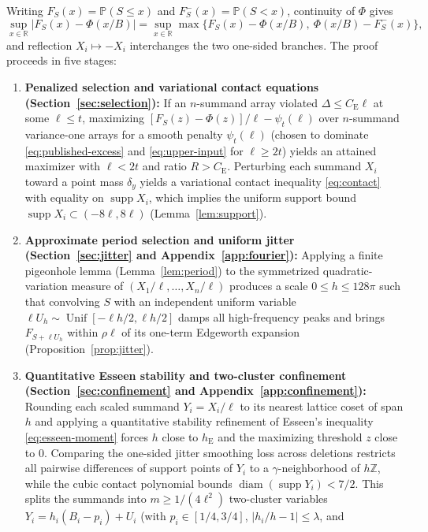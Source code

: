 \documentclass[11pt]{article}
\numberwithin{equation}{section}
\theoremstyle{remark}
\DeclareMathOperator{\supp}{supp}
\newcommand{\Pp}{\mathbb P}
\newcommand{\R}{\mathbb R}
\newcommand{\Z}{\mathbb Z}
\newcommand{\be}{C_{\mathrm E}}
\newcommand{\he}{h_{\mathrm E}}
\begin{document}
Writing $F_S(x)=\Pp(S\le x)$ and $F_S^-(x)=\Pp(S<x)$, continuity of $\Phi$
gives
\begin{equation}\label{eq:branches}
 \sup_{x\in\R}|F_S(x)-\Phi(x/B)|
 =\sup_{x\in\R}\max\{F_S(x)-\Phi(x/B),\ \Phi(x/B)-F_S^-(x)\},
\end{equation}
and reflection $X_i\mapsto-X_i$ interchanges the two one-sided branches.
The proof proceeds in five stages:
\begin{enumerate}[label=(\arabic*),leftmargin=2em]
\item \textbf{Penalized selection and variational contact equations
(Section~\ref{sec:selection}):} If an $n$-summand array violated
$\Delta\le\be\ell$ at some $\ell\le t$, maximizing
$[F_S(z)-\Phi(z)]/\ell-\psi_t(\ell)$ over $n$-summand variance-one arrays
for a smooth penalty $\psi_t(\ell)$ (chosen to dominate \eqref{eq:published-excess}
and \eqref{eq:upper-input} for $\ell\ge2t$) yields an attained maximizer with
$\ell<2t$ and ratio $R>\be$. Perturbing each summand $X_i$ toward a point mass
$\delta_y$ yields a variational contact inequality \eqref{eq:contact} with
equality on $\supp X_i$, which implies the uniform support bound
$\supp X_i\subset(-8\ell,8\ell)$ (Lemma~\ref{lem:support}).
\item \textbf{Approximate period selection and uniform jitter
(Section~\ref{sec:jitter} and Appendix~\ref{app:fourier}):} Applying a
finite pigeonhole lemma (Lemma~\ref{lem:period}) to the symmetrized
quadratic-variation measure of $(X_1/\ell,\ldots,X_n/\ell)$ produces a
scale $0\le h\le128\pi$ such that convolving $S$ with an independent uniform
variable $\ell U_h\sim\operatorname{Unif}[-\ell h/2,\ell h/2]$ damps all
high-frequency peaks and brings $F_{S+\ell U_h}$ within $\rho\ell$ of its
one-term Edgeworth expansion (Proposition~\ref{prop:jitter}).
\item \textbf{Quantitative Esseen stability and two-cluster confinement
(Section~\ref{sec:confinement} and Appendix~\ref{app:confinement}):}
Rounding each scaled summand $Y_i=X_i/\ell$ to its nearest lattice coset of
span $h$ and applying a quantitative stability refinement of Esseen's
inequality \eqref{eq:esseen-moment} forces $h$ close to $\he$ and the
maximizing threshold $z$ close to $0$. Comparing the one-sided jitter
smoothing loss across deletions restricts all pairwise differences of
support points of $Y_i$ to a $\gamma$-neighborhood of $h\Z$, while the cubic
contact polynomial bounds $\operatorname{diam}(\supp Y_i)<7/2$. This splits
the summands into $m\ge1/(4\ell^2)$ two-cluster variables
$Y_i=h_i(B_i-p_i)+U_i$ (with $p_i\in[1/4,3/4]$, $|h_i/h-1|\le\lambda$, and

\end{enumerate}
\end{document}

